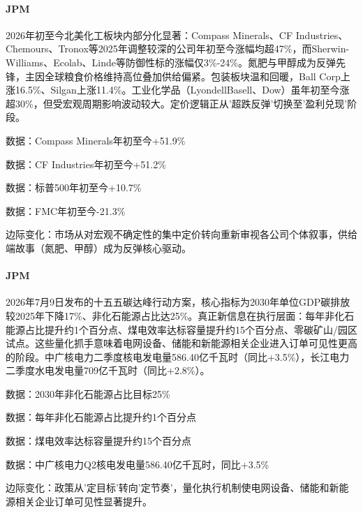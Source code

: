 \documentclass[11pt]{ctexart}
\begin{document}
\paragraph{JPM} 2026年初至今北美化工板块内部分化显著：Compass Minerals、CF Industries、Chemours、Tronox等2025年调整较深的公司年初至今涨幅均超47\%，而Sherwin-Williams、Ecolab、Linde等防御性标的涨幅仅3\%-24\%。氮肥与甲醇成为反弹先锋，主因全球粮食价格维持高位叠加供给偏紧。包装板块温和回暖，Ball Corp上涨16.5\%、Silgan上涨11.4\%。工业化学品（LyondellBasell、Dow）虽年初至今涨超30\%，但受宏观周期影响波动较大。定价逻辑正从'超跌反弹'切换至'盈利兑现'阶段。
{\small\color{refgray}数据：Compass Minerals年初至今+51.9\%\par}
{\small\color{refgray}数据：CF Industries年初至今+51.2\%\par}
{\small\color{refgray}数据：标普500年初至今+10.7\%\par}
{\small\color{refgray}数据：FMC年初至今-21.3\%\par}
{\small\color{refgray}边际变化：市场从对宏观不确定性的集中定价转向重新审视各公司个体叙事，供给端故事（氮肥、甲醇）成为反弹核心驱动。\par}
\paragraph{JPM} 2026年7月9日发布的十五五碳达峰行动方案，核心指标为2030年单位GDP碳排放较2025年下降17\%、非化石能源占比达25\%。真正新信息在执行层面：每年非化石能源占比提升约1个百分点、煤电效率达标容量提升约15个百分点、零碳矿山/园区试点。这些量化抓手意味着电网设备、储能和新能源相关企业进入订单可见性更高的阶段。中广核电力二季度核电发电量586.40亿千瓦时（同比+3.5\%），长江电力二季度水电发电量709亿千瓦时（同比+2.8\%）。
{\small\color{refgray}数据：2030年非化石能源占比目标25\%\par}
{\small\color{refgray}数据：每年非化石能源占比提升约1个百分点\par}
{\small\color{refgray}数据：煤电效率达标容量提升约15个百分点\par}
{\small\color{refgray}数据：中广核电力Q2核电发电量586.40亿千瓦时，同比+3.5\%\par}
{\small\color{refgray}边际变化：政策从'定目标'转向'定节奏'，量化执行机制使电网设备、储能和新能源相关企业订单可见性显著提升。\par}
\end{document}
